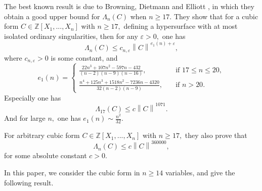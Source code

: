 \documentclass[12pt]{amsart}
\theoremstyle{definition}
\newtheorem*{xrem}{Remark}
\numberwithin{equation}{section}
\begin{document}
The best known result is due to Browning, Dietmann and Elliott \cite{browning2009least}, in which they obtain a good upper bound for $\Lambda_n (C)$ when $n \geq 17.$ They show that for a cubic form $C \in \mathbb{Z}[X_1,...,X_n]$ with $n \geq 17,$ defining a hypersurface with at most isolated ordinary singularities, then for any $\varepsilon >0,$ one has
\begin{equation*}
        \Lambda_n(C) \leq c_{n, \varepsilon} \left\| C\right\|^{e_1(n)+\varepsilon},
\end{equation*}
where $c_{n, \varepsilon} > 0$ is some constant, and
\begin{equation*}
        e_1(n)=
        \begin{cases}
        \frac{22n^3+107n^2-597n-432}{(n-2)(n-9)(n-16)}, \quad &\text{if }17 \leq n \leq 20,\\
        \frac{n^4+125n^3+1518n^2-7236n-4320}{32(n-2)(n-9)}, \quad &\text{if }n > 20.
    \end{cases}
    \end{equation*}
Especially one has
    \begin{equation*}
        \Lambda_{17}(C) \leq c \left\| C\right\|^{1071}.
    \end{equation*}
And for large $n,$ one has $e_1(n) \sim \frac{n^2}{32}. $


For arbitrary cubic form $C \in \mathbb{Z}[X_1,...,X_n]$ with $n \geq 17,$ they also prove that
\begin{equation*}
        \Lambda_n(C) \leq c \left\| C\right\|^{360000},
\end{equation*}
for some absolute constant $c>0.$

In this paper, we consider the cubic form in $n \geq 14$ variables, and give the following result.



\end{document}
